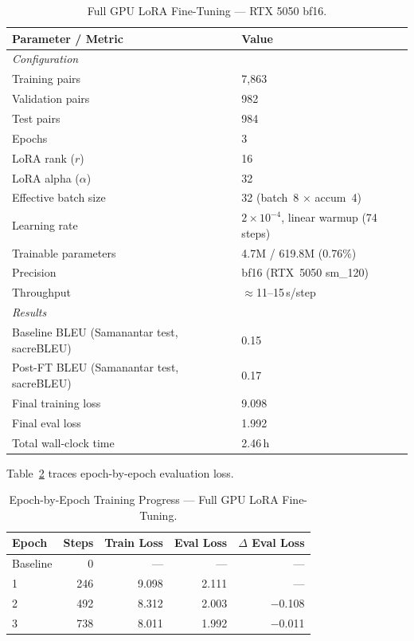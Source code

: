 \documentclass[journal]{IEEEtran}
\newcommand{\POSTFTBLEU}{0.17}
\newcommand{\TRAINLOSS}{9.098}
\newcommand{\TRAINDURATION}{2.46\,h}
\newcommand{\EVALLOSSFINAL}{1.992}
\begin{document}
\begin{table}[htbp]
\caption{Full GPU LoRA Fine-Tuning --- RTX 5050 bf16.}
\label{tab:finetune_gpu}
\centering
\small
\begin{tabular}{p{}p{}}
\toprule
Parameter / Metric & Value \\
\midrule
\multicolumn{2}{l}{\textit{Configuration}} \\
Training pairs & 7,863 \\
Validation pairs & 982 \\
Test pairs & 984 \\
Epochs & 3 \\
LoRA rank ($r$) & 16 \\
LoRA alpha ($\alpha$) & 32 \\
Effective batch size & 32 (batch~8 $\times$ accum~4) \\
Learning rate & $2{\times}10^{-4}$, linear warmup (74 steps) \\
Trainable parameters & 4.7M / 619.8M (0.76\%) \\
Precision & bf16 (RTX~5050 sm\_120) \\
Throughput & $\approx$11--15\,s/step \\
\midrule
\multicolumn{2}{l}{\textit{Results}} \\
Baseline BLEU (Samanantar test, sacreBLEU) & 0.15 \\
Post-FT BLEU (Samanantar test, sacreBLEU) & \POSTFTBLEU \\
Final training loss & \TRAINLOSS \\
Final eval loss & \EVALLOSSFINAL \\
Total wall-clock time & \TRAINDURATION \\
\bottomrule
\end{tabular}
\end{table}

Table~\ref{tab:epoch_progress} traces epoch-by-epoch evaluation loss.

\begin{table}[htbp]
\caption{Epoch-by-Epoch Training Progress --- Full GPU LoRA Fine-Tuning.}
\label{tab:epoch_progress}
\centering
\begin{tabular}{lrrrr}
\toprule
Epoch & Steps & Train Loss & Eval Loss & $\Delta$ Eval Loss \\
\midrule
Baseline & 0   & ---    & ---   & --- \\
1        & 246 & 9.098  & 2.111 & --- \\
2        & 492 & 8.312  & 2.003 & $-$0.108 \\
3        & 738 & 8.011  & 1.992 & $-$0.011 \\
\bottomrule
\end{tabular}
\end{table}
\end{document}
